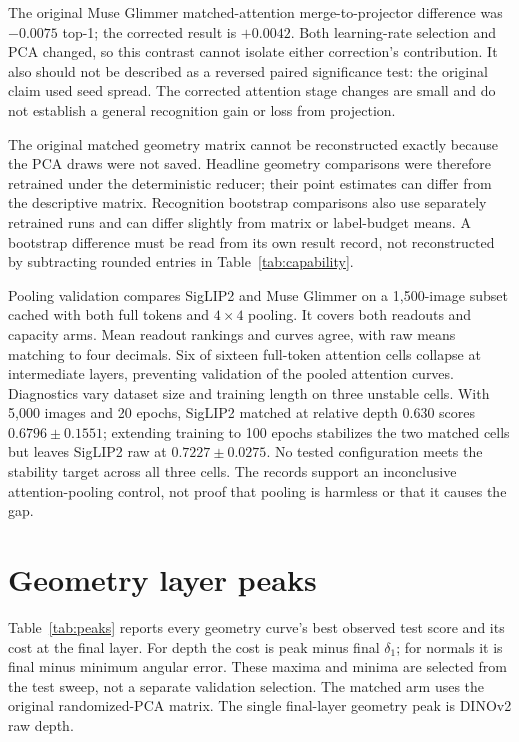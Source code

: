 The original Muse Glimmer matched-attention merge-to-projector difference was
$-0.0075$ top-1; the corrected result is $+0.0042$. Both learning-rate selection and
PCA changed, so this contrast cannot isolate either correction's contribution.
It also should not be described as a reversed paired significance test: the original
claim used seed spread. The corrected attention stage changes are small and do not
establish a general recognition gain or loss from projection.

The original matched geometry matrix cannot be reconstructed exactly because the PCA
draws were not saved. Headline geometry comparisons were therefore retrained under the
deterministic reducer; their point estimates can differ from the descriptive matrix.
Recognition bootstrap comparisons also use separately retrained runs and can differ
slightly from matrix or label-budget means. A bootstrap difference must be read from
its own result record, not reconstructed by subtracting rounded entries in Table~\ref{tab:capability}.

Pooling validation compares SigLIP2 and Muse Glimmer on a 1,500-image subset cached
with both full tokens and $4\times4$ pooling. It covers both readouts and capacity
arms. Mean readout rankings and curves agree, with raw means matching to four decimals.
Six of sixteen full-token attention cells collapse at intermediate layers, preventing
validation of the pooled attention curves. Diagnostics vary dataset size and training
length on three unstable cells. With 5,000 images and 20 epochs, SigLIP2 matched at
relative depth 0.630 scores $0.6796\pm0.1551$; extending training to 100 epochs stabilizes
the two matched cells but leaves SigLIP2 raw at $0.7227\pm0.0275$. No tested configuration
meets the stability target across all three cells. The records support an inconclusive
attention-pooling control, not proof that pooling is harmless or that it causes the gap.

\section{Geometry layer peaks}
\label{app:peaks}
Table~\ref{tab:peaks} reports every geometry curve's best observed test score and its
cost at the final layer. For depth the cost is peak minus final $\delta_1$; for normals
it is final minus minimum angular error. These maxima and minima are selected from the
test sweep, not a separate validation selection. The matched arm uses the original
randomized-PCA matrix. The single final-layer geometry peak is DINOv2 raw depth.

